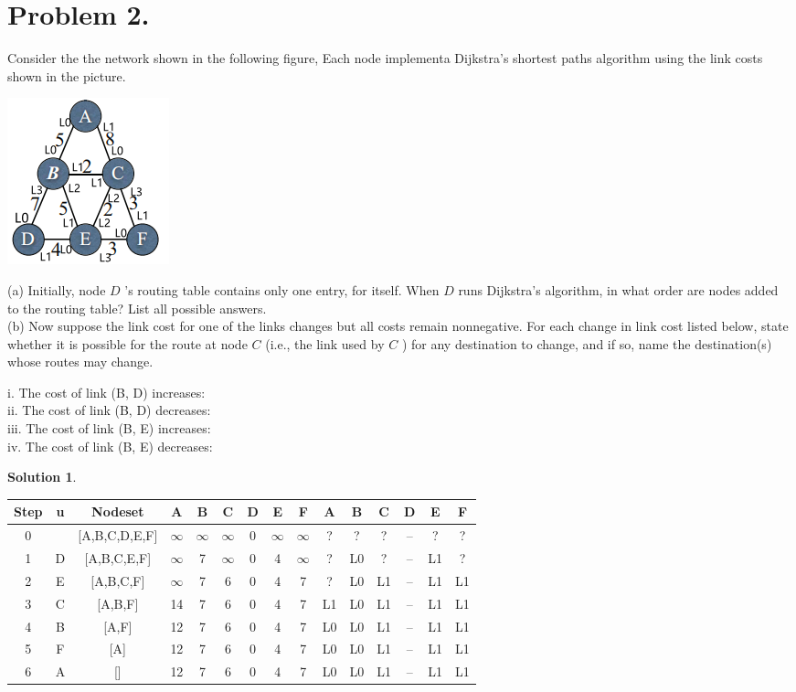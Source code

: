 \documentclass[UTF8,oneside]{article}
\newtheorem*{Solution}{Solution}
\begin{document}
\section*{Problem 2.}
Consider the the network shown in the following figure, Each node implementa Dijkstra's shortest paths algorithm using the link costs shown in the picture.\\
\begin{center}
\includegraphics[scale=1.0]{a.png}
\end{center}
(a) Initially, node $D$ 's routing table contains only one entry, for itself. When $D$ runs Dijkstra's algorithm, in what order are nodes added to the routing table? List all possible answers.\\
(b) Now suppose the link cost for one of the links changes but all costs remain nonnegative. For each change in link cost listed below, state whether it is possible for the route at node $C$ (i.e., the link used by $C$ ) for any destination to change, and if so, name the destination(s) whose routes may change.\\
\begin{center}
i. The cost of link (B, D) increases:\\
ii. The cost of link (B, D) decreases:\\
iii. The cost of link (B, E) increases:\\
iv. The cost of link (B, E) decreases:
\end{center}
\begin{Solution}
\end{Solution}
\begin{table}[h]
\centering
\begin{tabular}{|c|c|c|c|c|c|c|c|c|c|c|c|c|c|c|}
\hline
Step& u &Nodeset &A &B &C &D &E &F &A &B &C &D &E &F \\
\hline
0 &  &[A,B,C,D,E,F] &$\infty$ &$\infty$ &$\infty$& 0 &$\infty$ &$\infty$ &? &? & ? & -- &? &?\\
\hline
1 & D &[A,B,C,E,F] &$\infty$ &7 &$\infty$& 0 &4 &$\infty$ &? &L0 & ? & -- &L1 &?\\
\hline
2 & E &[A,B,C,F] &$\infty$ &7 & 6 & 0 &4 &7 &? &L0 & L1 & -- &L1 &L1 \\
\hline
3 & C &[A,B,F] &14 &7 & 6 & 0 &4 &7 &L1 &L0 & L1 & -- &L1 &L1 \\
\hline
4 & B &[A,F] &12 &7 & 6 & 0 &4 &7  &L0 &L0 & L1 & -- &L1 &L1\\
\hline
5& F &[A]  &12 &7 & 6 & 0 &4 &7  &L0 &L0 & L1 & -- &L1 &L1 \\
\hline
6 & A &[]  &12 &7 & 6 & 0 &4 &7  &L0 &L0 & L1 & -- &L1 &L1\\
\hline
\end{tabular}
\label{TAB1}
\end{table}
\end{document}

